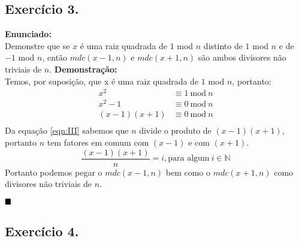 \documentclass[12pt]{article}
\newcommand{\bb}[1]{\mathbb{#1}}
\newcommand{\N}{\bb{N}}
\begin{document}
\subsection*{Exercício 3.}
	\textbf{Enunciado:}\\
	Demonstre que se $x$ é uma raiz quadrada de $1$ mod $n$ distinto de
	$1$ mod $n$ e de $-1$ mod $n$, então $mdc(x-1, n)$ e $mdc(x+1, n)$
	são ambos divisores não triviais de $n$.
	\newline
	\newline
	\textbf{Demonstração:}\\
	Temos, por suposição, que x é uma raiz quadrada de $1$ mod $n$, portanto:
	\begin{align*}
			x^2 &\equiv 1 \ \mathrm{mod} \ n\\
			x^2 - 1 &\equiv 0 \ \mathrm{mod} \ n\\
			\label{eqn:III}\tag{I}
				(x - 1)(x + 1) &\equiv 0 \ \mathrm{mod} \ n\\
	\end{align*}
	Da equação \eqref{eqn:III} sabemos que $n$ divide o produto de $(x-1)(x+1)$,
	portanto $n$ tem fatores em comum com $(x-1)$ e com $(x+1)$.\\
	$$\frac{(x-1)(x+1)}{n} = i,   \text{para algum} \  i \in \N$$
	Portanto podemos pegar o $mdc(x-1, n)$ bem como o $mdc(x+1, n)$ como divisores 
	não triviais de $n$.
	
	$\hfill\blacksquare$
	
\subsection*{Exercício 4.}
\end{document}
